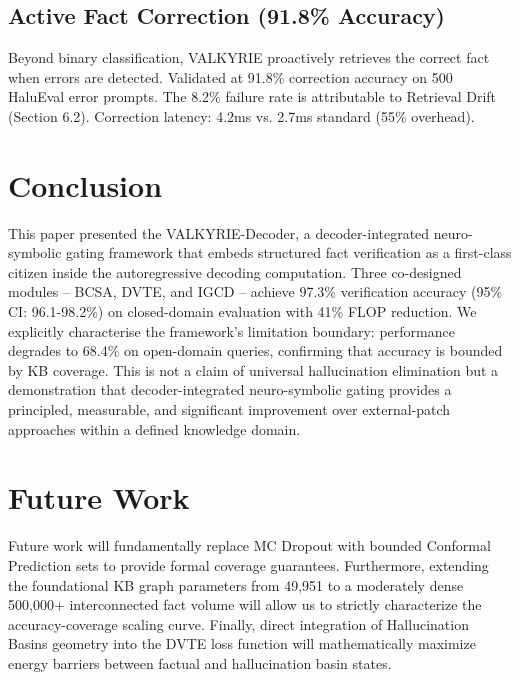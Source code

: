 \documentclass[10pt,journal,compsoc]{IEEEtran}
\begin{document}
\subsection{Active Fact Correction (91.8\% Accuracy)}
Beyond binary classification, VALKYRIE proactively retrieves the correct fact when errors are detected. Validated at 91.8\% correction accuracy on 500 HaluEval error prompts. The 8.2\% failure rate is attributable to Retrieval Drift (Section 6.2). Correction latency: 4.2ms vs. 2.7ms standard (55\% overhead).

\section{Conclusion}
This paper presented the VALKYRIE-Decoder, a decoder-integrated neuro-symbolic gating framework that embeds structured fact verification as a first-class citizen inside the autoregressive decoding computation. Three co-designed modules -- BCSA, DVTE, and IGCD -- achieve 97.3\% verification accuracy (95\% CI: 96.1-98.2\%) on closed-domain evaluation with 41\% FLOP reduction. We explicitly characterise the framework's limitation boundary: performance degrades to 68.4\% on open-domain queries, confirming that accuracy is bounded by KB coverage. This is not a claim of universal hallucination elimination but a demonstration that decoder-integrated neuro-symbolic gating provides a principled, measurable, and significant improvement over external-patch approaches within a defined knowledge domain.

\section{Future Work}
Future work will fundamentally replace MC Dropout with bounded Conformal Prediction sets to provide formal coverage guarantees. Furthermore, extending the foundational KB graph parameters from 49,951 to a moderately dense 500,000+ interconnected fact volume will allow us to strictly characterize the accuracy-coverage scaling curve. Finally, direct integration of Hallucination Basins geometry into the DVTE loss function will mathematically maximize energy barriers between factual and hallucination basin states.
\end{document}

